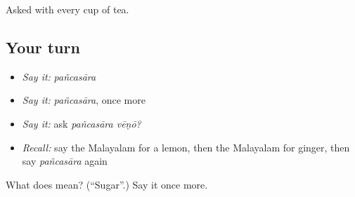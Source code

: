 \begin{grammarlens}[title={What you've built}]
Asked with every cup of tea.
\end{grammarlens}

\subsection*{Your turn}
\begin{itemize}
\raggedright
  \item \emph{Say it:} \emph{pañcasāra}
  \item \emph{Say it:} \emph{pañcasāra}, once more
  \item \emph{Say it:} ask \emph{pañcasāra vēṇō?}
  \item \emph{Recall:} say the Malayalam for a lemon, then the Malayalam for ginger, then say \emph{pañcasāra} again
\end{itemize}

\begin{tcolorbox}[breakable,colback=teal!4,colframe=teal!35!black,title={Before you move on}]
What does  mean? (\textquotedblleft{}Sugar\textquotedblright{}.) Say it once more.
\end{tcolorbox}
